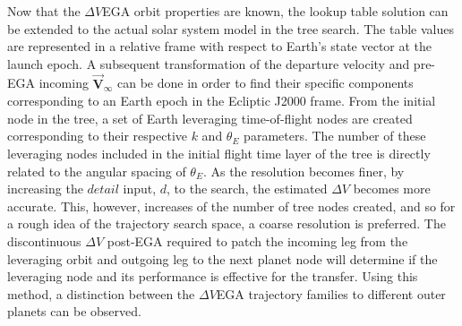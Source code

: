 \documentclass[letterpaper, paper,11pt]{./AAS}		%
\begin{document}
Now that the $\Delta V$EGA orbit properties are known, the lookup table solution can be extended to the actual solar system model in the tree search. The table values are represented in a relative frame with respect to Earth's state vector at the launch epoch. A subsequent transformation of the departure velocity and pre-EGA incoming $\vec{\textbf{V}}_{\infty}$ can be done in order to find their specific components corresponding to an Earth epoch in the Ecliptic J2000 frame. From the initial node in the tree, a set of Earth leveraging time-of-flight nodes are created corresponding to their respective $k$ and $\theta_E$ parameters. The number of these leveraging nodes included in the initial flight time layer of the tree is directly related to the angular spacing of $\theta_E$. As the resolution becomes finer, by increasing the $\textit{detail}$ input, $d$, to the search, the estimated $\Delta V$ becomes more accurate. This, however, increases of the number of tree nodes created, and so for a rough idea of the trajectory search space, a coarse resolution is preferred. The discontinuous $\Delta V$ post-EGA required to patch the incoming leg from the leveraging orbit and outgoing leg to the next planet node will determine if the leveraging node and its performance is effective for the transfer. Using this method, a distinction between the $\Delta V$EGA trajectory families to different outer planets can be observed.


\phantom{p. 1}
\clearpage
\end{document}
